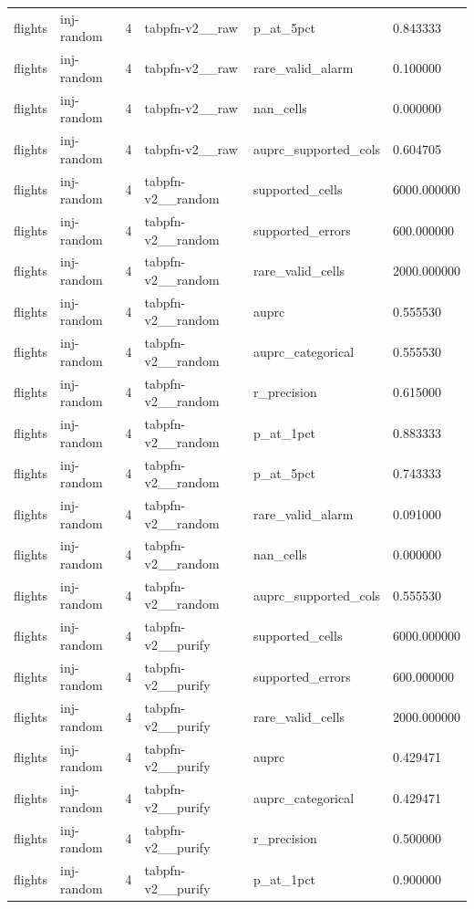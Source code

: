 \begin{tabular}{llllll}
flights & inj-random & 4 & tabpfn-v2\_\_raw & p\_at\_5pct & 0.843333 \\
flights & inj-random & 4 & tabpfn-v2\_\_raw & rare\_valid\_alarm & 0.100000 \\
flights & inj-random & 4 & tabpfn-v2\_\_raw & nan\_cells & 0.000000 \\
flights & inj-random & 4 & tabpfn-v2\_\_raw & auprc\_supported\_cols & 0.604705 \\
flights & inj-random & 4 & tabpfn-v2\_\_random & supported\_cells & 6000.000000 \\
flights & inj-random & 4 & tabpfn-v2\_\_random & supported\_errors & 600.000000 \\
flights & inj-random & 4 & tabpfn-v2\_\_random & rare\_valid\_cells & 2000.000000 \\
flights & inj-random & 4 & tabpfn-v2\_\_random & auprc & 0.555530 \\
flights & inj-random & 4 & tabpfn-v2\_\_random & auprc\_categorical & 0.555530 \\
flights & inj-random & 4 & tabpfn-v2\_\_random & r\_precision & 0.615000 \\
flights & inj-random & 4 & tabpfn-v2\_\_random & p\_at\_1pct & 0.883333 \\
flights & inj-random & 4 & tabpfn-v2\_\_random & p\_at\_5pct & 0.743333 \\
flights & inj-random & 4 & tabpfn-v2\_\_random & rare\_valid\_alarm & 0.091000 \\
flights & inj-random & 4 & tabpfn-v2\_\_random & nan\_cells & 0.000000 \\
flights & inj-random & 4 & tabpfn-v2\_\_random & auprc\_supported\_cols & 0.555530 \\
flights & inj-random & 4 & tabpfn-v2\_\_purify & supported\_cells & 6000.000000 \\
flights & inj-random & 4 & tabpfn-v2\_\_purify & supported\_errors & 600.000000 \\
flights & inj-random & 4 & tabpfn-v2\_\_purify & rare\_valid\_cells & 2000.000000 \\
flights & inj-random & 4 & tabpfn-v2\_\_purify & auprc & 0.429471 \\
flights & inj-random & 4 & tabpfn-v2\_\_purify & auprc\_categorical & 0.429471 \\
flights & inj-random & 4 & tabpfn-v2\_\_purify & r\_precision & 0.500000 \\
flights & inj-random & 4 & tabpfn-v2\_\_purify & p\_at\_1pct & 0.900000 \\

\end{tabular}
